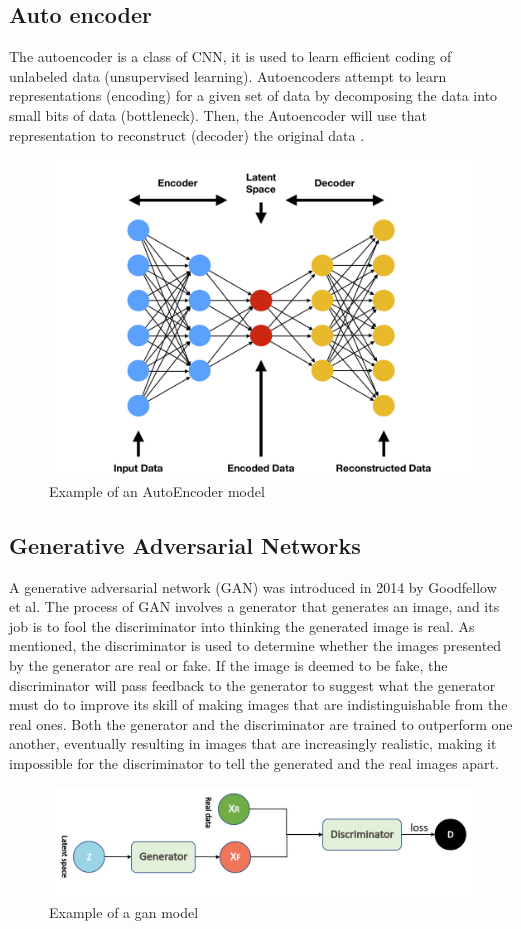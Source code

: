\subsection{Auto encoder}
The autoencoder is a class of CNN, it is used to learn efficient coding of unlabeled data (unsupervised learning). Autoencoders attempt to learn representations (encoding) for a given set of data by decomposing the data into small bits of data (bottleneck). Then, the Autoencoder will use that representation to reconstruct (decoder) the original data \cite{IntroductionToAutoencoders}.
\begin{figure}[H]
    \centering
    \includegraphics[width=0.6\columnwidth]{sections/figures/autoencoder_image.png}
    \caption{Example of an AutoEncoder model \cite{flores_2019}}
    \label{fig:my_label}
\end{figure}

\subsection{Generative Adversarial Networks}
A generative adversarial network (GAN) was introduced in 2014 by Goodfellow et al\cite{goodfellow2014generative}. The process of GAN involves a generator that generates an image, and its job is to fool the discriminator into thinking the generated image is real. As mentioned, the discriminator is used to determine whether the images presented by the generator are real or fake. If the image is deemed to be fake, the discriminator will pass feedback to the generator to suggest what the generator must do to improve its skill of making images that are indistinguishable from the real ones\cite{introToGanJasonBrownlee}. Both the generator and the discriminator are trained to outperform one another, eventually resulting in images that are increasingly realistic, making it impossible for the discriminator to tell the generated and the real images apart\cite{franoischollet2017learning}.
\begin{figure}[H]
    \centering
    \includegraphics[width=0.7\columnwidth]{sections/figures/gan.JPG}
    \caption{Example of a gan model \cite{bagheri_2019}}
    \label{fig:my_label}
\end{figure}


